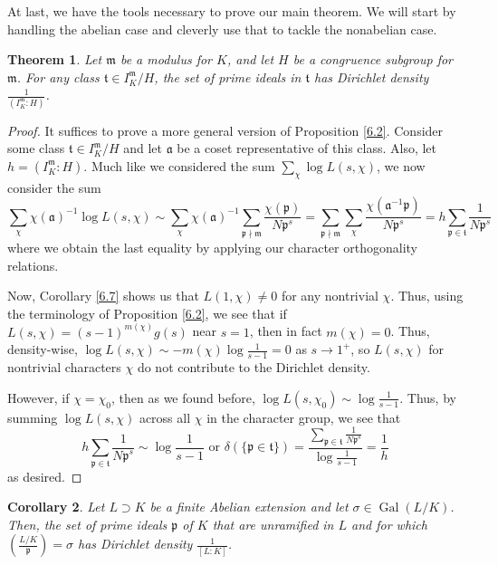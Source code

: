 \documentclass{article}
\DeclareMathOperator{\Gal}{Gal}
\theoremstyle{plain}
\newtheorem{thm}{Theorem}
\newtheorem{cor}[thm]{Corollary}
\theoremstyle{definition}
\theoremstyle{remark}
\numberwithin{equation}{section}
\numberwithin{thm}{section}
\begin{document}
At last, we have the tools necessary to prove our main theorem. We will start by handling the abelian case and cleverly use that to tackle the nonabelian case. 

\begin{thm} \label{7.1}
Let $\mathfrak{m}$ be a modulus for $K$, and let $H$ be a congruence subgroup for $\mathfrak{m}$. For any class $\mathfrak{t} \in I_{K}^{\mathfrak{m}}/H$, the set of prime ideals in $\mathfrak{t}$ has Dirichlet density $\frac{1}{(I_{K}^{\mathfrak{m}} : H)}$. 
\end{thm}

\begin{proof}
It suffices to prove a more general version of Proposition \ref{6.2}. Consider some class $\mathfrak{t} \in I_{K}^{\mathfrak{m}}/H$ and let $\mathfrak{a}$ be a coset representative of this class. Also, let $h = (I_{K}^{\mathfrak{m}} : H)$. Much like we considered the sum $\sum_{\chi} \log L(s,\chi)$, we now consider the sum $$\sum_{\chi} \chi(\mathfrak{a})^{-1}\log L(s, \chi) \sim \sum_{\chi} \chi(\mathfrak{a})^{-1} \sum_{\mathfrak{p} \nmid \mathfrak{m}} \frac{\chi(\mathfrak{p})}{N\mathfrak{p}^{s}} = \sum_{\mathfrak{p} \nmid \mathfrak{m}} \sum_{\chi} \frac{\chi(\mathfrak{a}^{-1}\mathfrak{p})}{N\mathfrak{p}^{s}} = h \sum_{\mathfrak{p} \in \mathfrak{t}} \frac{1}{N\mathfrak{p}^{s}}$$ where we obtain the last equality by applying our character orthogonality relations. 

Now, Corollary \ref{6.7} shows us that $L(1, \chi) \neq 0$ for any nontrivial $\chi$. Thus, using the terminology of Proposition \ref{6.2}, we see that if $L(s, \chi) = (s-1)^{m(\chi)}g(s)$ near $s = 1$, then in fact $m(\chi) = 0$. Thus, density-wise, $\log L(s, \chi) \sim -m(\chi)\log\frac{1}{s-1} = 0$ as $s \to 1^{+}$, so $L(s, \chi)$ for nontrivial characters $\chi$ do not contribute to the Dirichlet density. 

However, if $\chi = \chi_{0}$, then as we found before, $\log L(s, \chi_{0}) \sim \log\frac{1}{s-1}$. Thus, by summing $\log L(s, \chi)$ across all $\chi$ in the character group, we see that $$h \sum_{\mathfrak{p} \in \mathfrak{t}} \frac{1}{N\mathfrak{p}^{s}} \sim \log\frac{1}{s-1} \text{ or } \delta(\{\mathfrak{p} \in \mathfrak{t}\}) = \frac{\sum_{\mathfrak{p} \in \mathfrak{t}} \frac{1}{N\mathfrak{p}^{s}}}{\log\frac{1}{s-1}} = \frac{1}{h}$$ as desired.
\end{proof}

\begin{cor} \label{7.2}
Let $L \supset K$ be a finite Abelian extension and let $\sigma \in \Gal(L/K)$. Then, the set of prime ideals $\mathfrak{p}$ of $K$ that are unramified in $L$ and for which $\left(\frac{L/K}{\mathfrak{p}}\right) = \sigma$ has Dirichlet density $\frac{1}{[L : K]}$. 
\end{cor}
\end{document}
